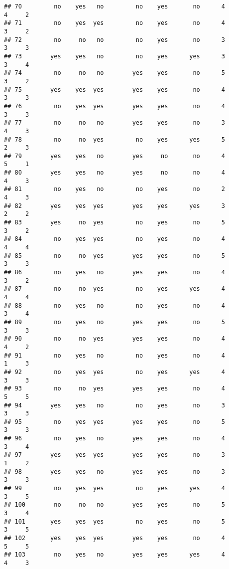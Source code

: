 \documentclass[]{article}
\begin{document}
\begin{verbatim}
## 70         no    yes   no         no    yes       no      4        4     2
## 71         no    yes  yes         no    yes       no      4        3     2
## 72         no     no   no         no    yes       no      3        3     3
## 73        yes    yes   no         no    yes      yes      3        3     4
## 74         no     no   no        yes    yes       no      5        3     2
## 75        yes    yes  yes        yes    yes       no      4        3     3
## 76         no    yes  yes        yes    yes       no      4        3     3
## 77         no     no   no        yes    yes       no      3        4     3
## 78         no     no  yes         no    yes      yes      5        2     3
## 79        yes    yes   no        yes     no       no      4        5     1
## 80        yes    yes   no        yes     no       no      4        4     3
## 81         no    yes   no         no    yes       no      2        4     3
## 82        yes    yes  yes        yes    yes      yes      3        2     2
## 83        yes     no  yes         no    yes       no      5        3     2
## 84         no    yes  yes         no    yes       no      4        4     4
## 85         no     no  yes        yes    yes       no      5        3     3
## 86         no    yes   no        yes    yes       no      4        3     2
## 87         no     no  yes         no    yes      yes      4        4     4
## 88         no    yes   no         no    yes       no      4        3     4
## 89         no    yes   no        yes    yes       no      5        3     3
## 90         no     no  yes        yes    yes       no      4        4     2
## 91         no    yes   no         no    yes       no      4        1     3
## 92         no    yes  yes         no    yes      yes      4        3     3
## 93         no     no  yes        yes    yes       no      4        5     5
## 94        yes    yes   no         no    yes       no      3        3     3
## 95         no    yes  yes        yes    yes       no      5        3     3
## 96         no    yes   no        yes    yes       no      4        3     4
## 97        yes    yes  yes        yes    yes       no      3        1     2
## 98        yes    yes   no        yes    yes       no      3        3     3
## 99         no    yes  yes         no    yes      yes      4        3     5
## 100        no     no   no        yes    yes       no      5        3     4
## 101       yes    yes  yes         no    yes       no      5        3     5
## 102       yes    yes  yes        yes    yes       no      4        5     5
## 103        no    yes   no        yes    yes      yes      4        4     3

\end{verbatim}
\end{document}
